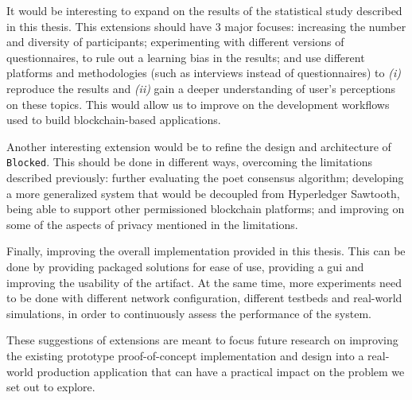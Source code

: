 It would be interesting to expand on the results of the statistical study described in this thesis. This extensions should have 3 major focuses: increasing the number and diversity of participants; experimenting with different versions of questionnaires, to rule out a learning bias in the results; and use different platforms and methodologies (such as interviews instead of questionnaires) to \emph{(i)} reproduce the results and \emph{(ii)} gain a deeper understanding of user's perceptions on these topics. This would allow us to improve on the development workflows used to build blockchain-based applications.

Another interesting extension would be to refine the design and architecture of \texttt{Blocked}. This should be done in different ways, overcoming the limitations described previously: further evaluating the \gls{poet} consensus algorithm; developing a more generalized system that would be decoupled from Hyperledger Sawtooth, being able to support other permissioned blockchain platforms; and improving on some of the aspects of privacy mentioned in the limitations.

Finally, improving the overall implementation provided in this thesis. This can be done by providing packaged solutions for ease of use, providing a \gls{gui} and improving the usability of the artifact. At the same time, more experiments need to be done with different network configuration, different testbeds and real-world simulations, in order to continuously assess the performance of the system.

These suggestions of extensions are meant to focus future research on improving the existing prototype proof-of-concept implementation and design into a real-world production application that can have a practical impact on the problem we set out to explore.




